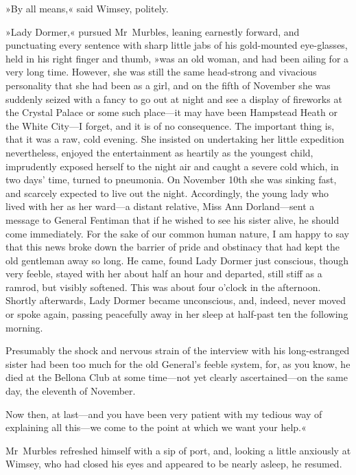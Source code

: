 »By all means,« said Wimsey, politely.

»Lady Dormer,« pursued Mr~Murbles, leaning earnestly forward, and punctuating every sentence with sharp little jabs of his gold-mounted eye-glasses, held in his right finger and thumb, »was an old woman, and had been ailing for a very long time. However, she was still the same head-strong and vivacious personality that she had been as a girl, and on the fifth of November she was suddenly seized with a fancy to go out at night and see a display of fireworks at the Crystal Palace or some such place—it may have been Hampstead Heath or the White City—I forget, and it is of no consequence. The important thing is, that it was a raw, cold evening. She insisted on undertaking her little expedition nevertheless, enjoyed the entertainment as heartily as the youngest child, imprudently exposed herself to the night air and caught a severe cold which, in two days' time, turned to pneumonia. On November  10th she was sinking fast, and scarcely expected to live out the night. Accordingly, the young lady who lived with her as her ward—a distant relative, Miss Ann Dorland—sent a message to General Fentiman that if he wished to see his sister alive, he should come immediately. For the sake of our common human nature, I am happy to say that this news broke down the barrier of pride and obstinacy that had kept the old gentleman away so long. He came, found Lady Dormer just conscious, though very feeble, stayed with her about half an hour and departed, still stiff as a ramrod, but visibly softened. This was about four o'clock in the afternoon. Shortly afterwards, Lady Dormer became unconscious, and, indeed, never moved or spoke again, passing peacefully away in her sleep at half-past ten the following morning.

Presumably the shock and nervous strain of the interview with his long-estranged sister had been too much for the old General's feeble system, for, as you know, he died at the Bellona Club at some time—not yet clearly ascertained—on the same day, the eleventh of November.

Now then, at last—and you have been very patient with my tedious way of explaining all this—we come to the point at which we want your help.«

Mr~Murbles refreshed himself with a sip of port, and, looking a little anxiously at Wimsey, who had closed his eyes and appeared to be nearly asleep, he resumed.

